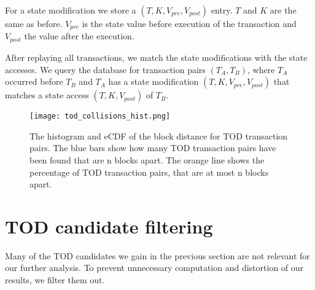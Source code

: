 \documentclass[draft,final]{vutinfth} %
\begin{document}
For a state modification we store a $(T, K, V_{pre}, V_{post})$ entry. $T$ and $K$ are the same as before. $V_{pre}$ is the state value before execution of the transaction and $V_{post}$ the value after the execution.

After replaying all transactions, we match the state modifications with the state accesses. We query the database for transaction pairs $(T_A, T_B)$, where $T_A$ occurred before $T_B$ and $T_A$ has a state modification $(T, K, V_{pre}, V_{post})$ that matches a state access $(T, K, V_{post})$ of $T_B$.


\iffalse
    Contrary to the definition of TOD, this does not necessarily mean, that the execution of $T_B$ yields a different result because of $T_A$. For instance if $T_A$ modifies storage value from $1$ to $2$ and $T_B$ loads this storage value without using it, there is no impact on $T_B$. \todo{this should go to the definition/general TOD discussion section}
\fi




\begin{figure}[h]
    \centering
    \texttt{[image: tod\_collisions\_hist.png]}
    \caption{The histogram and eCDF of the block distance for TOD transaction pairs. The blue bars show how many TOD transaction pairs have been found that are n blocks apart. The orange line shows the percentage of TOD transaction pairs, that are at most n blocks apart.}
    \label{fig:tod_block_dist}
\end{figure}


\section{TOD candidate filtering}

Many of the TOD candidates we gain in the previous section are not relevant for our further analysis. To prevent unnecessary computation and distortion of our results, we filter them out.
\end{document}
